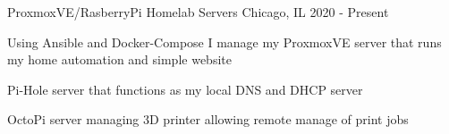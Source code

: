 

\begin{cventries}

	\cventry
	{ProxmoxVE/RasberryPi} %
	{Homelab Servers} %
	{Chicago, IL} %
	{2020 - Present} %
	{
		\begin{cvitems} %
			\item {Using Ansible and Docker-Compose I manage my ProxmoxVE server that runs my home automation and simple website}
			\item {Pi-Hole server that functions as my local DNS and DHCP server}
			\item {OctoPi server managing 3D printer allowing remote manage of print jobs}
		\end{cvitems}
	}

\end{cventries}
